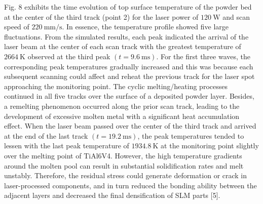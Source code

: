 \documentclass[10pt]{article}
\begin{document}
Fig. 8 exhibits the time evolution of top surface temperature of the powder bed at the center of the third track (point 2) for the laser power of $120 \mathrm{~W}$ and scan speed of $220 \mathrm{~mm} / \mathrm{s}$. In essence, the temperature profile showed five large fluctuations. From the simulated results, each peak indicated the arrival of the laser beam at the center of each scan track with the greatest temperature of $2664 \mathrm{~K}$ observed at the third peak $(t=9.6 \mathrm{~ms})$. For the first three waves, the corresponding peak temperatures gradually increased and this was because each subsequent scanning could affect and reheat the previous track for the laser spot approaching the monitoring point. The cyclic melting/heating processes continued in all five tracks over the surface of a deposited powder layer. Besides, a remelting phenomenon occurred along the prior scan track, leading to the development of excessive molten metal with a significant heat accumulation effect. When the laser beam passed over the center of the third track and arrived at the end of the last track $(t=19.2 \mathrm{~ms})$, the peak temperatures tended to lessen with the last peak temperature of $1934.8 \mathrm{~K}$ at the monitoring point slightly over the melting point of TiAl6V4. However, the high temperature gradients around the molten pool can result in substantial solidification rates and melt unstably. Therefore, the residual stress could generate deformation or crack in laser-processed components, and in turn reduced the bonding ability between the adjacent layers and decreased the final densification of SLM parts [5].\\
\end{document}
